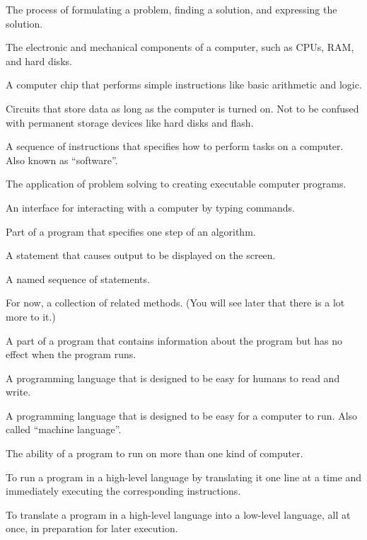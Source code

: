 \begin{description}

The process of formulating a problem, finding a solution, and expressing the solution.

The electronic and mechanical components of a computer, such as CPUs, RAM, and hard disks.

A computer chip that performs simple instructions like basic arithmetic and logic.

Circuits that store data as long as the computer is turned on.
Not to be confused with permanent storage devices like hard disks and flash.

A sequence of instructions that specifies how to perform tasks on a computer.
Also known as ``software''.

The application of problem solving to creating executable computer programs.

An interface for interacting with a computer by typing commands.

Part of a program that specifies one step of an algorithm.

A statement that causes output to be displayed on the screen.

A named sequence of statements.

For now, a collection of related methods.
(You will see later that there is a lot more to it.)

A part of a program that contains information about the program but has no effect when the program runs.

A programming language that is designed to be easy for humans to read and write.

A programming language that is designed to be easy for a computer to run.
Also called ``machine language''. %

The ability of a program to run on more than one kind of computer.

To run a program in a high-level language by translating it one line at a time and immediately executing the corresponding instructions.

To translate a program in a high-level language into a low-level language, all at once, in preparation for later execution.


\end{description}
